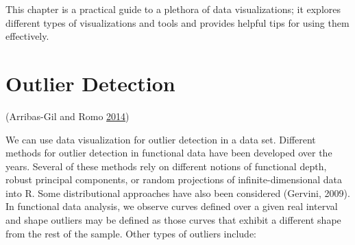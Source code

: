 \documentclass[]{book}
\begin{document}
This chapter is a practical guide to a plethora of data visualizations;
it explores different types of visualizations and tools and provides
helpful tips for using them effectively.

\section{Outlier Detection}\label{outlier-detection}

(Arribas-Gil and Romo \protect\hyperlink{ref-outliar}{2014})

We can use data visualization for outlier detection in a data set.
Different methods for outlier detection in functional data have been
developed over the years. Several of these methods rely on different
notions of functional depth, robust principal components, or random
projections of infinite-dimensional data into R. Some distributional
approaches have also been considered (Gervini, 2009). In functional data
analysis, we observe curves defined over a given real interval and shape
outliers may be defined as those curves that exhibit a different shape
from the rest of the sample. Other types of outliers include:
\end{document}
